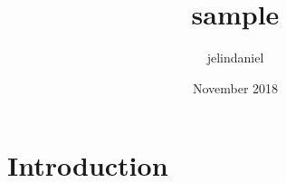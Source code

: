\documentclass{article}
\title{sample}
\author{jelindaniel }
\date{November 2018}
\begin{document}
\maketitle

\section{Introduction}
\end{document}
